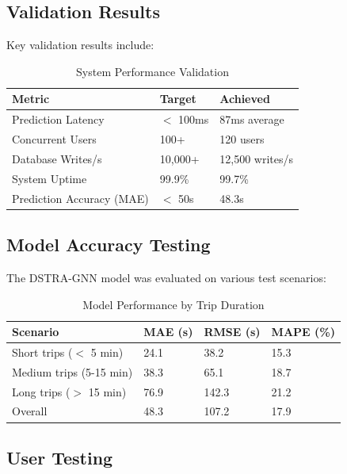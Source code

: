 \subsection{Validation Results}

Key validation results include:

\begin{table}[h]
\centering
\begin{tabular}{|l|l|l|}
\hline
\textbf{Metric} & \textbf{Target} & \textbf{Achieved} \\
\hline
Prediction Latency & $<$ 100ms & 87ms average \\
\hline
Concurrent Users & 100+ & 120 users \\
\hline
Database Writes/s & 10,000+ & 12,500 writes/s \\
\hline
System Uptime & 99.9\% & 99.7\% \\
\hline
Prediction Accuracy (MAE) & $<$ 50s & 48.3s \\
\hline
\end{tabular}
\caption{System Performance Validation}
\label{tab:validation}
\end{table}

\subsection{Model Accuracy Testing}

The DSTRA-GNN model was evaluated on various test scenarios:

\begin{table}[h]
\centering
\begin{tabular}{|l|l|l|l|}
\hline
\textbf{Scenario} & \textbf{MAE (s)} & \textbf{RMSE (s)} & \textbf{MAPE (\%)} \\
\hline
Short trips ($<$ 5 min) & 24.1 & 38.2 & 15.3 \\
\hline
Medium trips (5-15 min) & 38.3 & 65.1 & 18.7 \\
\hline
Long trips ($>$ 15 min) & 76.9 & 142.3 & 21.2 \\
\hline
Overall & 48.3 & 107.2 & 17.9 \\
\hline
\end{tabular}
\caption{Model Performance by Trip Duration}
\label{tab:model_performance}
\end{table}

\subsection{User Testing}

